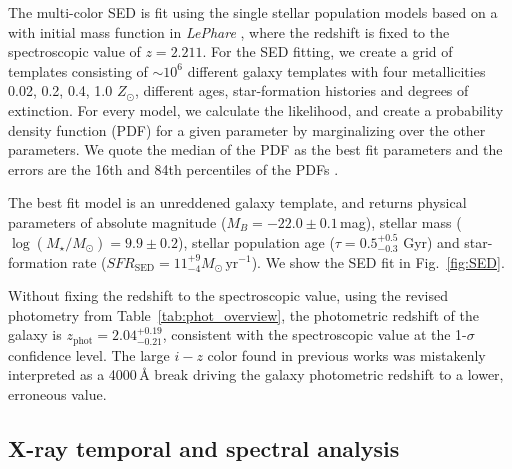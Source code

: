 \documentclass{aa}    %
\begin{document}


The multi-color SED is fit using the \citet{Bruzual2003} single stellar
population models based on a \citet{Chabrier2003} with initial mass function in
\emph{LePhare} \citep{Ilbert2006}, where the redshift is fixed to the
spectroscopic value of $z=2.211$. For the SED fitting, we create a grid of
templates consisting of $\sim 10^6$  different galaxy templates with four
metallicities 0.02, 0.2, 0.4, 1.0 $Z_{\odot}$, different ages, star-formation
histories and degrees of extinction. For every model, we calculate the
likelihood, and create a probability density function (PDF) for a given
parameter by marginalizing over the other parameters. We quote the median of the
PDF as the best fit parameters and the errors are the 16th and 84th percentiles
of the PDFs \citep[e.g. see][for details on the SED fitting
procedure]{Schulze2016}.

The best fit model is an unreddened galaxy
template, and returns physical parameters of absolute magnitude
($M_B=-22.0\pm0.1$\,mag), stellar mass ($\log(M_{\star}/M_\odot) = 9.9\pm0.2$),
stellar population age ($\tau = 0.5_{-0.3}^{+0.5}$ Gyr) and star-formation rate
($SFR_{\mathrm{SED}}=11_{-4}^{+9} M_\odot\,\mathrm{yr}^{-1}$). We show the SED
fit in Fig.~\ref{fig:SED}.

Without fixing the redshift to the spectroscopic value, using the revised
photometry from Table~\ref{tab:phot_overview}, the photometric redshift of the
galaxy is $z_{\mathrm{phot}}=2.04_{-0.21}^{+0.19}$, consistent with the
spectroscopic value at the 1-$\sigma$ confidence level. The large $i-z$ color
found in previous works was mistakenly interpreted as a 4000\,\AA{} break
driving the galaxy photometric redshift to a lower, erroneous value.

\subsection{X-ray temporal and spectral analysis}\label{xray}
\end{document}
